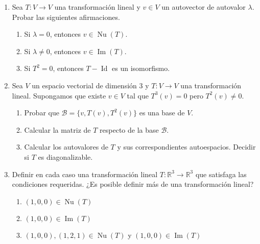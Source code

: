 \begin{enumerate}[topsep=6pt, itemsep=.4cm]
\item Sea $T:V\longrightarrow V$ una transformación lineal y $v\in V$ un autovector de autovalor $\lambda$. Probar las siguientes afirmaciones.
\begin{enumerate}
    \item\label{autovalor-autovector-a} Si $\lambda=0$, entonces $v\in\operatorname{Nu}(T)$.
    \item\label{autovalor-autovector-b} Si $\lambda\neq0$, entonces $v\in\operatorname{Im}(T)$.
    \item\label{autovalor-autovector-c} Si $T^2=0$, entonces $T-\operatorname{Id}$ es un isomorfismo.
\end{enumerate}


\item\label{base nilp}  Sea $V$ un espacio vectorial de dimensión $3$ y $T:V\longrightarrow V$ una transformación lineal. Supongamos que existe $v\in V$ tal que $T^3(v)=0$ pero $T^2(v)\neq0$.
\begin{enumerate}
    \item\label{base nilp a}  Probar que $\mathcal{B}=\{v,T(v),T^2(v)\}$ es una base de $V$.
    \item\label{base nilp b} Calcular la matriz de $T$ respecto de la base $\mathcal{B}$.
    \item\label{base nilp c} Calcular los autovalores de $T$ y sus correspondientes autoespacios. Decidir si $T$ es diagonalizable.
\end{enumerate}

        
\item Definir en cada caso una transformación lineal $T:\mathbb{R}^3\longrightarrow\mathbb{R}^3$ que satisfaga las condiciones requeridas. ¿Es posible definir más de una transformación lineal?
\begin{enumerate}
    \item\label{tl-condiciones-a} $(1,0,0)\in \operatorname{Nu}(T)$ 
    \item\label{tl-condiciones-b} $(1,0,0)\in \operatorname{Im}(T)$ 
    \item\label{tl-condiciones-c} $(1,0,0),(1,2,1)\in\operatorname{Nu}(T)$ y $(1,0,0) \in  \operatorname{Im}(T)$
\end{enumerate}



\end{enumerate}
